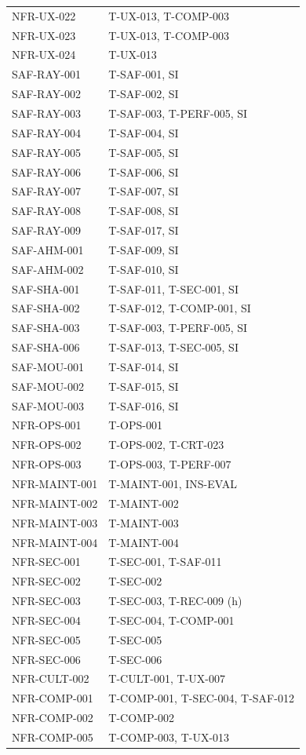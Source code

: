 \documentclass[12pt, titlepage]{article}
\begin{document}
{\begin{longtable}{@{}>{\raggedright\arraybackslash}p{}>{\raggedright\arraybackslash}p{}@{}}
NFR-UX-022 & T-UX-013, T-COMP-003\\
NFR-UX-023 & T-UX-013, T-COMP-003\\
NFR-UX-024 & T-UX-013\\
SAF-RAY-001 & T-SAF-001, SI\\
SAF-RAY-002 & T-SAF-002, SI\\
SAF-RAY-003 & T-SAF-003, T-PERF-005, SI\\
SAF-RAY-004 & T-SAF-004, SI\\
SAF-RAY-005 & T-SAF-005, SI\\
SAF-RAY-006 & T-SAF-006, SI\\
SAF-RAY-007 & T-SAF-007, SI\\
SAF-RAY-008 & T-SAF-008, SI\\
SAF-RAY-009 & T-SAF-017, SI\\
SAF-AHM-001 & T-SAF-009, SI\\
SAF-AHM-002 & T-SAF-010, SI\\
SAF-SHA-001 & T-SAF-011, T-SEC-001, SI\\
SAF-SHA-002 & T-SAF-012, T-COMP-001, SI\\
SAF-SHA-003 & T-SAF-003, T-PERF-005, SI\\
SAF-SHA-006 & T-SAF-013, T-SEC-005, SI\\
SAF-MOU-001 & T-SAF-014, SI\\
SAF-MOU-002 & T-SAF-015, SI\\
SAF-MOU-003 & T-SAF-016, SI\\
NFR-OPS-001 & T-OPS-001\\
NFR-OPS-002 & T-OPS-002, T-CRT-023\\
NFR-OPS-003 & T-OPS-003, T-PERF-007\\
NFR-MAINT-001 & T-MAINT-001, INS-EVAL\\
NFR-MAINT-002 & T-MAINT-002\\
NFR-MAINT-003 & T-MAINT-003\\
NFR-MAINT-004 & T-MAINT-004\\
NFR-SEC-001 & T-SEC-001, T-SAF-011\\
NFR-SEC-002 & T-SEC-002\\
NFR-SEC-003 & T-SEC-003, T-REC-009 (h)\\
NFR-SEC-004 & T-SEC-004, T-COMP-001\\
NFR-SEC-005 & T-SEC-005\\
NFR-SEC-006 & T-SEC-006\\
NFR-CULT-002 & T-CULT-001, T-UX-007\\
NFR-COMP-001 & T-COMP-001, T-SEC-004, T-SAF-012\\
NFR-COMP-002 & T-COMP-002\\
NFR-COMP-005 & T-COMP-003, T-UX-013\\
\bottomrule
\end{longtable}}
\end{document}
